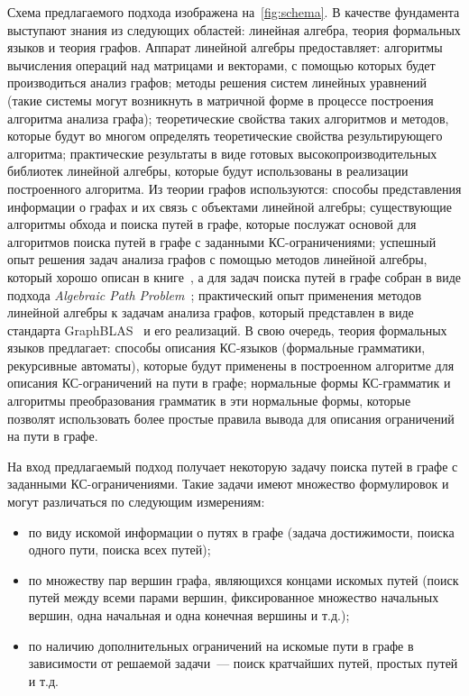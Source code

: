 Схема предлагаемого подхода изображена на~\cref{fig:schema}. В качестве фундамента выступают знания из следующих областей: линейная алгебра, теория формальных языков и теория графов. Аппарат линейной алгебры предоставляет: алгоритмы вычисления операций над матрицами и векторами, с помощью которых будет производиться анализ графов; методы решения систем линейных уравнений (такие системы могут возникнуть в матричной форме в процессе построения алгоритма анализа графа); теоретические свойства таких алгоритмов и методов, которые будут во многом определять теоретические свойства результирующего алгоритма; практические результаты в виде готовых высокопроизводительных библиотек линейной алгебры, которые будут использованы в реализации построенного алгоритма. Из теории графов используются: способы представления информации о графах и их связь с объектами линейной алгебры; существующие алгоритмы обхода и поиска путей в графе, которые послужат основой для алгоритмов поиска путей в графе с заданными КС-ограничениями; успешный опыт решения задач анализа графов с помощью методов линейной алгебры, который хорошо описан в книге~\cite{kepner2011graph}, а для задач поиска путей в графе собран в виде подхода \textit{Algebraic Path Problem}~\cite{rote1990path,baras2010path,chen1992parallel,lengauer1991unstructured}; практический опыт применения методов линейной алгебры к задачам анализа графов, который представлен в виде стандарта GraphBLAS~\cite{graphblas} и его реализаций. В свою очередь, теория формальных языков предлагает: способы описания КС-языков (формальные грамматики, рекурсивные автоматы), которые будут применены в построенном алгоритме для описания КС-ограничений на пути в графе; нормальные формы КС-грамматик и алгоритмы преобразования грамматик в эти нормальные формы, которые позволят использовать более простые правила вывода для описания ограничений на пути в графе.

На вход предлагаемый подход получает некоторую задачу поиска путей в графе с заданными КС-ограничениями. Такие задачи имеют множество формулировок и могут  различаться по следующим измерениям:
\begin{itemize}
    \item по виду искомой информации о путях в графе (задача достижимости, поиска одного пути, поиска всех путей);
    \item по множеству пар вершин графа, являющихся концами искомых путей (поиск путей между всеми парами вершин, фиксированное множество начальных вершин, одна начальная и одна конечная вершины и т.д.);
    \item по наличию дополнительных ограничений на искомые пути в графе в зависимости от решаемой задачи~--- поиск кратчайших путей, простых путей и т.д.
\end{itemize}

